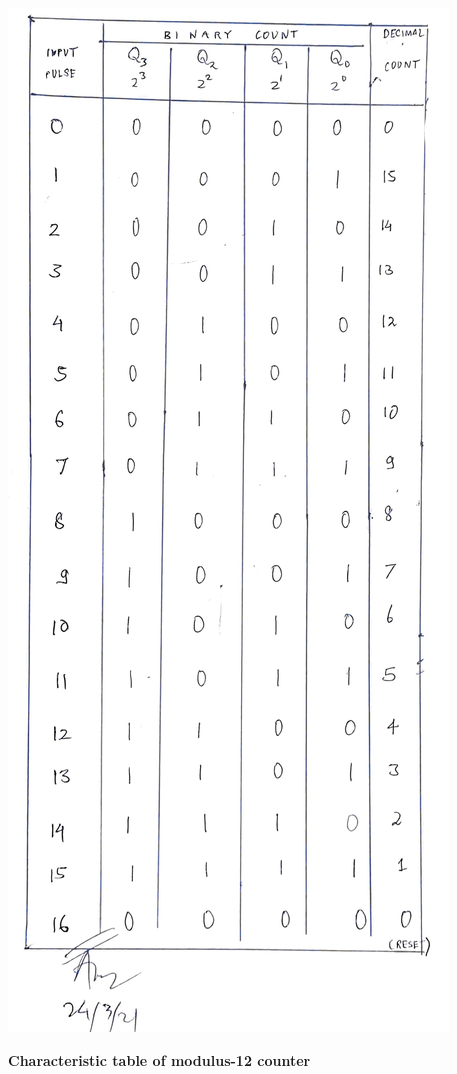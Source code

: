\begin{center}
    \includegraphics[scale = 0.15]{Figures/tabdown_1.jpg}
\end{center}
\begin{center}
    \textbf{Characteristic table of modulus-12 counter}
\end{center}
